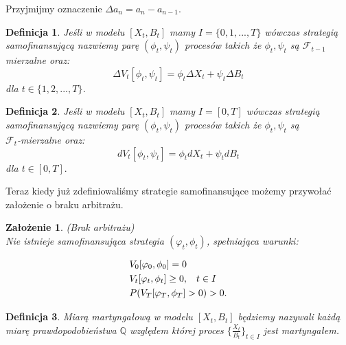 \documentclass[11pt]{report}
\newtheorem{df}{Definicja}[chapter]
\newtheorem{zal}{Założenie}[chapter]
\begin{document}
\begin{center} 
Przyjmijmy oznaczenie $\Delta a_n = a_{n} - a_{n-1}$.
\end{center}  
 
\begin{df} Jeśli w modelu $[X_t, B_t]$ mamy $I = \{0,1,...,T \}$ wówczas strategią samofinansującą nazwiemy parę $(\phi_t, \psi_t)$ procesów takich że $\phi_t,\psi_t$ są $\mathscr{F}_{t-1}$ mierzalne oraz: 
\begin{equation*}
\Delta V_t[\phi_t,\psi_t] = \phi_t \Delta X_t + \psi_t \Delta B_t
\end{equation*} 
dla $t \in \{1,2,...,T\}$.

\end{df}

\begin{df} Jeśli w modelu $[X_t, B_t]$ mamy $I = [0,T]$ wówczas strategią samofinansującą nazwiemy parę $(\phi_t, \psi_t)$ procesów takich że $\phi_t,\psi_t$ są \\ $\mathscr{F}_{t}$-mierzalne oraz: 
\begin{equation*}
d V_t[\phi_t,\psi_t] = \phi_t d X_t + \psi_t d B_t
\end{equation*}
dla $t \in [0,T].$
\end{df}

Teraz kiedy już zdefiniowaliśmy strategie samofinansujące możemy przywołać założenie o braku arbitrażu.

\begin{zal}(Brak arbitrażu) \\
Nie istnieje samofinansująca strategia $ (\varphi_t, \phi_t) $, spełniająca warunki:
\end{zal}

\begin{equation*}
\begin{split}
& V_0[\varphi_0, \phi_0] =  0 \\
& V_t[\varphi_t, \phi_t] \ge  0, \hspace{0,3 cm} t \in I  \\
& P( V_T[\varphi_T, \phi_T] >  0 ) > 0. \\ 
\end{split}
\end{equation*}



\begin{df}
Miarą martyngałową w modelu $[X_t, B_t]$ będziemy nazywali każdą miarę prawdopodobieństwa $\mathbb{Q}$ względem której proces $ \{ \frac{X_t}{B_t} \}_{t \in I}$ jest martyngałem. 
\end{df}
\end{document}
